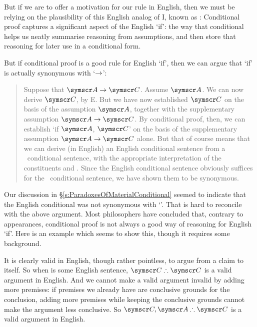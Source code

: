 But if we are to offer a motivation for our rule in English, then we must be relying on the plausibility of this English analog of {\eif}I, known as :  Conditional proof captures a significant aspect of the English `if': the way that  conditional helps us neatly summarise reasoning from assumptions, and then store that reasoning for later use in a conditional form.



But if conditional proof is a good rule for English `if', then we can argue that `if' is actually synonymous with `$\rightarrow$':\ \begin{quote}
Suppose that $\meta{A} \eif \meta{C}$. Assume $\meta{A}$. We can now derive $\meta{C}$, by {\eif}E. But we have now established $\meta{C}$ on the basis of the assumption $\meta{A}$, together with the supplementary assumption $\meta{A}\eif \meta{C}$. By conditional proof, then, we can establish `if $\meta{A}$, $\meta{C}$' on the basis of the supplementary assumption $\meta{A}\eif \meta{C}$ alone. But that of course means that we can derive (in English) an English conditional sentence from a \TFL\ conditional sentence, with the appropriate interpretation of the constituents  and . Since the English conditional sentence obviously suffices for the \TFL\ conditional sentence, we have shown them to be synonymous. 
\end{quote}  

Our discussion in §\ref{s:ParadoxesOfMaterialConditional} seemed to indicate that the English conditional was not synonymous with `\eif'. That is hard to reconcile with the above argument. Most philosophers have concluded that, contrary to appearances, conditional proof is not always a good way of reasoning for English `if'. Here is an example which seems to show this, though it requires some background.

It is clearly valid in English, though rather pointless, to argue from a claim to itself. So when  is some English sentence, $\meta{C} \ttherefore \meta{C}$ is a valid argument in English. And we cannot make a valid argument invalid by adding more premises:  if premises we already have are conclusive grounds for the conclusion, adding more premises while keeping the conclusive grounds cannot make the argument less conclusive. So $\meta{C},\meta{A} \ttherefore \meta{C}$ is a valid argument in English. 

